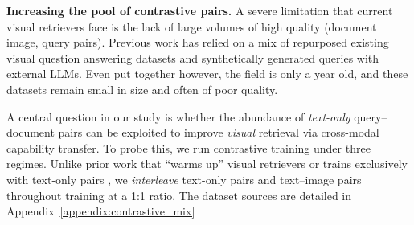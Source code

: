 \noindent\textbf{Increasing the pool of contrastive pairs.}
\label{sec:scaling=-cont}
A severe limitation that current visual retrievers face is the lack of large volumes of high quality (document image, query pairs). 
Previous work \citep{ma2024unifyingmultimodalretrievaldocument, faysse2025colpaliefficientdocumentretrieval, jiang2025vlm2vectrainingvisionlanguagemodels, zhang2025gmeimprovinguniversalmultimodal} has relied on a mix of repurposed existing visual question answering datasets and synthetically generated queries with external LLMs. Even put together however, the field is only a year old, and these datasets remain small in size and often of poor quality.


A central question in our study is whether the abundance of \emph{text-only} query–document pairs can be exploited to improve \emph{visual} retrieval via cross-modal capability transfer. To probe this, we run contrastive training under three regimes. Unlike prior work that “warms up” visual retrievers or trains exclusively with text-only pairs \citep{ma2024unifyingmultimodalretrievaldocument, jiang2024e5vuniversalembeddingsmultimodal}, we \emph{interleave} text-only pairs and text–image pairs throughout training at a 1:1 ratio. The dataset sources are detailed in Appendix~\ref{appendix:contrastive_mix}


